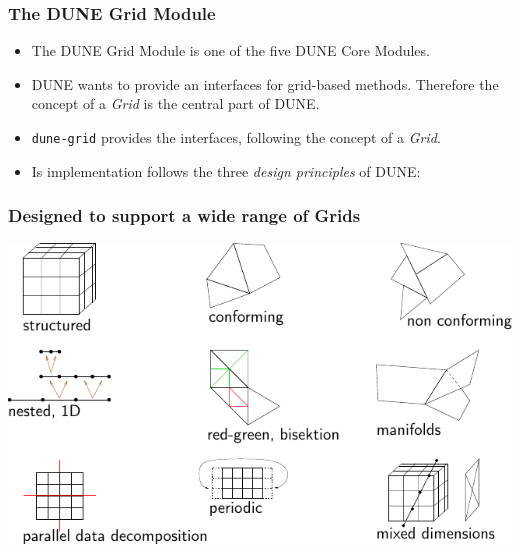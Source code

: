 \documentclass[ignorenonframetext,11pt]{beamer}
\theoremstyle{definition}
\begin{document}
\begin{frame} \frametitle{The DUNE Grid Module}
  \begin{itemize}
  \item The DUNE Grid Module is one of the five DUNE Core Modules.

  \item DUNE wants to provide an interfaces for grid-based
    methods. Therefore the concept of a \emph{Grid} is the central part
    of DUNE.

  \item \texttt{dune-grid} provides the interfaces, following the concept
    of a \emph{Grid}.

  \item Is implementation follows the three \emph{design principles} of
    DUNE:

  \end{itemize}
\end{frame}

\begin{frame}
  \frametitle<presentation>{Designed to support a wide range of Grids}
  \includegraphics[width=\linewidth]{grids}
\end{frame}
\end{document}
